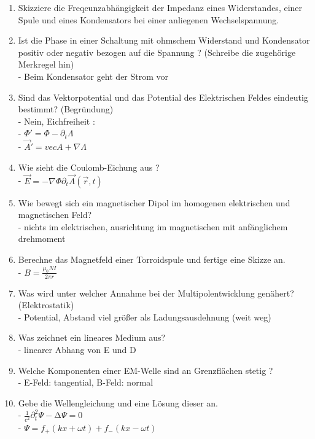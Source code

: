 \begin{enumerate}
  \item Skizziere die Freqeunzabhängigkeit der Impedanz eines Widerstandes, einer Spule und eines Kondensators
  bei einer anliegenen Wechselspannung.\\

  \item Ist die Phase in einer Schaltung mit ohmschem Widerstand und Kondensator positiv oder
  negativ bezogen auf die Spannung ? (Schreibe die zugehörige Merkregel hin) \\
  - Beim Kondensator geht der Strom vor

  \item Sind das Vektorpotential und das Potential des Elektrischen Feldes eindeutig bestimmt? (Begründung)\\
  - Nein, Eichfreiheit : \\
  - $\Phi' = \Phi - \partial_t \Lambda$ \\
  - $\vec{A}' = vec{A} + \nabla \Lambda$ \\

  \item Wie sieht die Coulomb-Eichung aus ? \\
  - $\vec{E} = - \nabla \Phi \partial_t \vec{A}(\vec{r},t)$

  \item Wie bewegt sich ein magnetischer Dipol im homogenen elektrischen und magnetischen Feld? \\
  - nichts im elektrischen, ausrichtung im magnetischen mit anfänglichem drehmoment

  \item Berechne das Magnetfeld einer Torroidspule und fertige eine Skizze an. \\
  - $B = \frac{\mu_0NI}{2\pi r}$

  \item Was wird unter welcher Annahme bei der Multipolentwicklung genähert? (Elektrostatik) \\
  - Potential, Abstand viel größer als Ladungsausdehnung (weit weg)

  \item Was zeichnet ein lineares Medium aus? \\
  - linearer Abhang von E und D

  \item Welche Komponenten einer EM-Welle sind an Grenzflächen stetig ? \\
  - E-Feld: tangential, B-Feld: normal

  \item Gebe die Wellengleichung und eine Lösung dieser an. \\
  - $ \frac{1}{c^2} \partial_t^2 \Psi - \increment \Psi = 0 $ \\
  - $\Psi = f_+(kx+\omega t) + f_-(kx-\omega t) $ \\


\end{enumerate}

